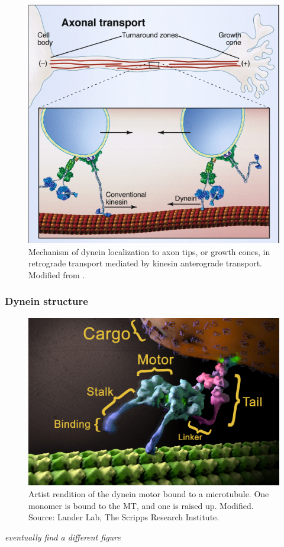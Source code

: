 \documentclass[10pt]{article} %
\begin{document}
\begin{figure}[h]
  \centering
  \includegraphics[width=.65\textwidth,keepaspectratio]{../figures/retrograde_transport.jpg}
  \caption{Mechanism of dynein localization to axon tips, or growth cones, in retrograde transport mediated by kinesin anterograde transport. Modified from \cite{valetoolbox}.}
  \label{retrograde-transport}
\end{figure}

\subsubsection{Dynein structure}

\begin{figure}[h]
  \centering
  \includegraphics[width=.65\textwidth,keepaspectratio]{../figures/dynein-artist-rendition.jpg}
  \caption{Artist rendition of the dynein motor bound to a microtubule. One monomer is bound to the MT, and one is raised up. Modified. Source: Lander Lab, The Scripps Research Institute.}
  \label{dynein-artist-rendition-2}
\end{figure}

\textit{eventually find a different figure}
\end{document}
